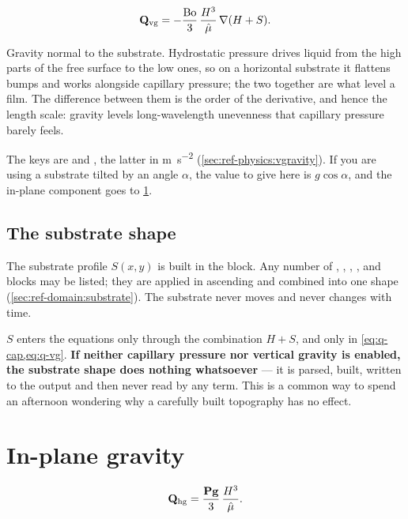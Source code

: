 \begin{equation}\label{eq:q-vg}
  \mathbf{Q}_{\mathrm{vg}} = -\frac{\mathrm{Bo}}{3}\,\frac{H^{3}}{\hat{\mu}}\,\nabla(H+S).
\end{equation}

Gravity normal to the substrate. Hydrostatic pressure drives liquid from the
high parts of the free surface to the low ones, so on a horizontal substrate it
flattens bumps and works alongside capillary pressure; the two together are
what level a film. The difference between them is the order of the derivative,
and hence the length scale: gravity levels long-wavelength unevenness that
capillary pressure barely feels.

The keys are  and
, the latter in
\si{\metre\per\second\squared} (\cref{sec:ref-physics:vgravity}). If you are
using a substrate tilted by an angle $\alpha$, the value to give here is
$g\cos\alpha$, and the in-plane component goes to
\cref{sec:terms:hgravity}.

\subsection*{The substrate shape}

The substrate profile $S(x,y)$ is built in the  block. Any
number of , , ,
,  and  blocks may be listed;
they are applied in ascending  and combined into one shape
(\cref{sec:ref-domain:substrate}). The substrate never moves and never changes
with time.

$S$ enters the equations only through the combination $H+S$, and only in
\cref{eq:q-cap,eq:q-vg}. \textbf{If neither capillary pressure nor vertical
gravity is enabled, the substrate shape does nothing whatsoever} --- it is
parsed, built, written to the output and then never read by any term. This is
a common way to spend an afternoon wondering why a carefully built topography
has no effect.

\section{In-plane gravity}
\label{sec:terms:hgravity}

\begin{equation}\label{eq:q-hg}
  \mathbf{Q}_{\mathrm{hg}} = \frac{\mathbf{Pg}}{3}\,\frac{H^{3}}{\hat{\mu}}.
\end{equation}


